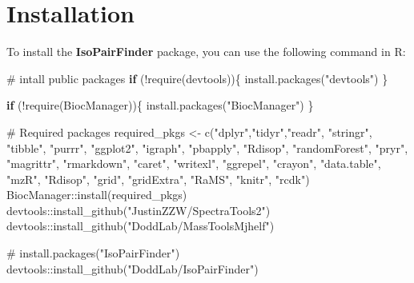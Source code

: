 \documentclass[
  letterpaper,
  DIV=11,
  numbers=noendperiod]{scrreprt}
\newenvironment{Shaded}{\begin{snugshade}}{\end{snugshade}}
\newcommand{\CommentTok}[1]{\textcolor[rgb]{0.37,0.37,0.37}{#1}}
\newcommand{\ControlFlowTok}[1]{\textcolor[rgb]{0.00,0.23,0.31}{\textbf{#1}}}
\newcommand{\FunctionTok}[1]{\textcolor[rgb]{0.28,0.35,0.67}{#1}}
\newcommand{\NormalTok}[1]{\textcolor[rgb]{0.00,0.23,0.31}{#1}}
\newcommand{\OtherTok}[1]{\textcolor[rgb]{0.00,0.23,0.31}{#1}}
\newcommand{\SpecialCharTok}[1]{\textcolor[rgb]{0.37,0.37,0.37}{#1}}
\newcommand{\StringTok}[1]{\textcolor[rgb]{0.13,0.47,0.30}{#1}}
\begin{document}
\section{Installation}\label{installation}

To install the \textbf{IsoPairFinder} package, you can use the following
command in R:

\begin{Shaded}
\begin{Highlighting}[]
\CommentTok{\# intall public packages}
\ControlFlowTok{if}\NormalTok{ (}\SpecialCharTok{!}\FunctionTok{require}\NormalTok{(devtools))\{}
    \FunctionTok{install.packages}\NormalTok{(}\StringTok{"devtools"}\NormalTok{)}
\NormalTok{\}}

\ControlFlowTok{if}\NormalTok{ (}\SpecialCharTok{!}\FunctionTok{require}\NormalTok{(BiocManager))\{}
    \FunctionTok{install.packages}\NormalTok{(}\StringTok{"BiocManager"}\NormalTok{)}
\NormalTok{\}}

\CommentTok{\# Required packages}
\NormalTok{required\_pkgs }\OtherTok{\textless{}{-}} \FunctionTok{c}\NormalTok{(}\StringTok{"dplyr"}\NormalTok{,}\StringTok{"tidyr"}\NormalTok{,}\StringTok{"readr"}\NormalTok{, }\StringTok{"stringr"}\NormalTok{, }\StringTok{"tibble"}\NormalTok{, }\StringTok{"purrr"}\NormalTok{,}
                   \StringTok{"ggplot2"}\NormalTok{, }\StringTok{"igraph"}\NormalTok{, }\StringTok{"pbapply"}\NormalTok{, }\StringTok{"Rdisop"}\NormalTok{, }\StringTok{"randomForest"}\NormalTok{, }\StringTok{"pryr"}\NormalTok{, }
                   \StringTok{"magrittr"}\NormalTok{, }\StringTok{"rmarkdown"}\NormalTok{, }\StringTok{"caret"}\NormalTok{, }\StringTok{"writexl"}\NormalTok{, }\StringTok{"ggrepel"}\NormalTok{, }\StringTok{"crayon"}\NormalTok{, }
                   \StringTok{"data.table"}\NormalTok{, }\StringTok{"mzR"}\NormalTok{, }\StringTok{"Rdisop"}\NormalTok{, }\StringTok{"grid"}\NormalTok{, }\StringTok{"gridExtra"}\NormalTok{, }\StringTok{"RaMS"}\NormalTok{, }\StringTok{"knitr"}\NormalTok{,}
                   \StringTok{"rcdk"}\NormalTok{)}
\NormalTok{BiocManager}\SpecialCharTok{::}\FunctionTok{install}\NormalTok{(required\_pkgs)}
\NormalTok{devtools}\SpecialCharTok{::}\FunctionTok{install\_github}\NormalTok{(}\StringTok{"JustinZZW/SpectraTools2"}\NormalTok{)}
\NormalTok{devtools}\SpecialCharTok{::}\FunctionTok{install\_github}\NormalTok{(}\StringTok{"DoddLab/MassToolsMjhelf"}\NormalTok{)}

\CommentTok{\# install.packages("IsoPairFinder")}
\NormalTok{devtools}\SpecialCharTok{::}\FunctionTok{install\_github}\NormalTok{(}\StringTok{"DoddLab/IsoPairFinder"}\NormalTok{)}
\end{Highlighting}
\end{Shaded}
\end{document}
